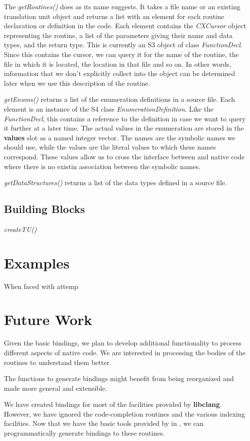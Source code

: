 \documentclass[article]{jss}
\def\R{\proglang{R}}
\def\Rpkg#1{\pkg{#1}}
\def\Rfunc#1{\textsl{#1()}}
\def\Rclass#1{\textit{#1}}
\def\Rslot#1{\textbf{#1}}
\def\libclang{\textbf{libclang}}
\begin{document}
The \Rfunc{getRoutines} does as its name suggests. It takes a file
name or an existing translation unit object and returns a list with an
element for each routine declaration or definition in the code.  Each
element contains the \Rclass{CXCursor} object representing the
routine, a list of the parameters giving their name and data types,
and the return type.  This is currently an S3 object of class
\Rclass{FunctionDecl}. Since this contains the cursor, we can query it
for the name of the routine, the file in which it is located, the
location in that file and so on. In other words, information that
we don't explicitly collect into the \R{} object can be determined
later when we use this description of the routine.

\Rfunc{getEnums} returns a list of the enumeration definitions in a
source file. Each element is an instance of the S4 class
\Rclass{EnumerationDefinition}.  Like the \Rclass{FunctionDecl}, this
contains a reference to the definition in case we want to query it
further at a later time.  The actual values in the enumeration are
stored in the \Rslot{values} slot as a named integer vector.  The
names are the symbolic names we should use, while the values are the
literal values to which these names correspond.  These values allow us
to cross the interface between \R{} and native code where there is no
existin association between the symbolic names.

\Rfunc{getDataStructures} returns a list of the data types defined in
a source file.


\subsection{Building Blocks}

\Rfunc{createTU}

\section{Examples}

When faced with attemp


\section{Future Work}

Given the basic bindings, we plan to develop additional functionality
to process different aspects of native code. We are interested in
processing the bodies of the routines to understand them better.

The functions to generate bindings might benefit from being
reorganized and made more general and extensible.

We have created bindings for most of the facilities provided by
\libclang.  However, we have ignored the code-completion routines and
the various indexing facilities.  Now that we have the basic tools
provided by \Rpkg{RCIndex} in \R, we can programmatically generate
bindings to these routines. 



\end{document}
